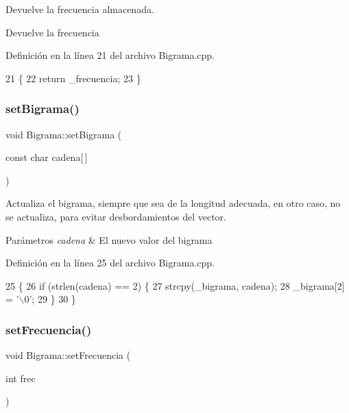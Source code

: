 Devuelve la frecuencia almacenada. 

\begin{DoxyReturn}{Devuelve}
la frecuencia 
\end{DoxyReturn}


Definición en la línea 21 del archivo Bigrama.\+cpp.


\begin{DoxyCode}
21                                  \{
22     \textcolor{keywordflow}{return} \_frecuencia;
23 \}
\end{DoxyCode}
\mbox{\label{classBigrama_ad9f512b7f00068f100f2fdfb5de32746}} 
\subsubsection{\texorpdfstring{set\+Bigrama()}{setBigrama()}}
{\footnotesize\ttfamily void Bigrama\+::set\+Bigrama (\begin{DoxyParamCaption}\item[{const char}]{cadena\mbox{[}$\,$\mbox{]} }\end{DoxyParamCaption})}



Actualiza el bigrama, siempre que sea de la longitud adecuada, en otro caso, no se actualiza, para evitar desbordamientos del vector. 


\begin{DoxyParams}{Parámetros}
{\em cadena} & El nuevo valor del bigrama \\
\hline
\end{DoxyParams}


Definición en la línea 25 del archivo Bigrama.\+cpp.


\begin{DoxyCode}
25                                             \{
26     \textcolor{keywordflow}{if} (strlen(cadena) == 2) \{
27         strcpy(\_bigrama, cadena);
28         \_bigrama[2] = \textcolor{charliteral}{'\(\backslash\)0'};
29     \}
30 \}
\end{DoxyCode}
\mbox{\label{classBigrama_a63dd808514f1eaf233f49cbbe3c2af82}} 
\subsubsection{\texorpdfstring{set\+Frecuencia()}{setFrecuencia()}}
{\footnotesize\ttfamily void Bigrama\+::set\+Frecuencia (\begin{DoxyParamCaption}\item[{int}]{frec }\end{DoxyParamCaption})}



